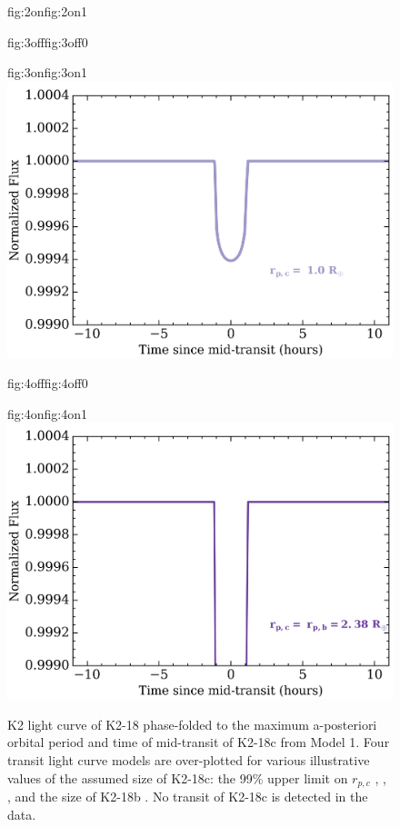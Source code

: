 \begin{figure}
\begin{ocg}{fig:2on}{fig:2on}{1}
  \end{ocg}%
  \hspace{-0.8\hsize}%
  \begin{ocg}{fig:3off}{fig:3off}{0}%
  \end{ocg}%
  \begin{ocg}{fig:3on}{fig:3on}{1}%
    \includegraphics[width=0.8\hsize]{figures/transits_3.png}%
  \end{ocg}%
  \hspace{-0.8\hsize}%
  \begin{ocg}{fig:4off}{fig:4off}{0}%
  \end{ocg}%
  \begin{ocg}{fig:4on}{fig:4on}{1}%
    \includegraphics[width=0.8\hsize]{figures/transits_4.png}%
  \end{ocg}%
  \caption{K2 light curve of K2-18 phase-folded to the maximum a-posteriori orbital period
    and time of mid-transit of K2-18c from Model 1. Four transit light curve models are over-plotted
    for various illustrative values of the assumed size of K2-18c: the 99\% upper limit on $r_{p,c}$   
    , 
    ,
    , and the size of K2-18b
    . No transit of K2-18c is
    detected in the data.}
  \label{k218fig:transit}
\end{figure}


